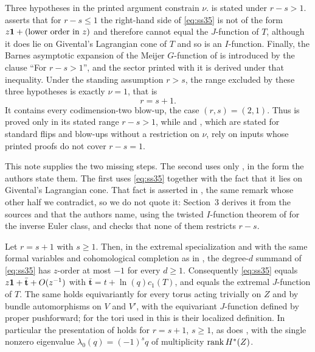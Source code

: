 Three hypotheses in the printed argument constrain \(\nu\).
\cite[Theorem~4.4]{SS} is stated under \(r-s>1\).
\cite[Remark~4.5(3)]{SS} asserts that for \(r-s\le1\) the right-hand side of
\eqref{eq:ss35} is not of the form \(z\mathbf 1+(\text{lower order in }z)\) and
therefore cannot equal the \(J\)-function of \(T\), although it does lie on
Givental's Lagrangian cone of \(T\) and so is an \(I\)-function.  Finally,
the Barnes asymptotic expansion of the Meijer \(G\)-function of
\cite[Lemma~7.4]{SS} is introduced by the clause ``For \(r-s>1\)'', and the
sector \cite[(64)]{SS} printed with it is derived under that inequality.
Under the standing assumption \(r>s\), the range excluded by these three
hypotheses is exactly \(\nu=1\), that is
\[
  r=s+1 .
\]
It contains every codimension-two blow-up, the case \((r,s)=(2,1)\).  Thus
\cite[Theorem~1.2]{SS} is proved only in its stated range \(r-s>1\), while
\cite[Theorems~1.4, 9.9 and~9.14]{SS} and \cite[Corollary~1.5]{SS}, which are
stated for standard flips and blow-ups without a restriction on \(\nu\), rely
on inputs whose printed proofs do not cover \(r-s=1\).

This note supplies the two missing steps.  The second uses only
\cite[Theorems~A.1 and~A.2]{SS}, in the form the authors state them.  The first uses
\eqref{eq:ss35} together with the fact that it lies on Givental's Lagrangian
cone.  That fact is asserted in \cite[Remark~4.5(3)]{SS}, the same remark
whose other half we contradict, so we do not quote it: Section~3 derives it
from the sources \cite{Brown} and \cite{CoatesGivental} that the authors
name, using the twisted \(I\)-function theorem of \cite{CCIT} for the
inverse Euler class, and checks that none of them restricts \(r-s\).

\begin{theorem}
  \label{thm:normalization}
  Let \(r=s+1\) with \(s\ge1\).  Then, in the extremal specialization
  \cite[(33)]{SS} and with the same formal variables and cohomological
  completion as in \cite[Theorem~4.4]{SS}, the degree-\(d\) summand of
  \eqref{eq:ss35} has \(z\)-order at most \(-1\) for every \(d\ge1\).
  Consequently \eqref{eq:ss35} equals \(z\mathbf 1+\bar{\mathbf t}+O(z^{-1})\)
  with \(\bar{\mathbf t}=t+\ln(q)c_{1}(T)\), and equals the extremal
  \(J\)-function of \(T\).  The same holds equivariantly for every torus
  acting trivially on \(Z\) and by bundle automorphisms on \(V\) and \(V'\),
  with the equivariant \(J\)-function defined by proper pushforward; for
  the tori used in \cite{SS} this is their localized definition.
  In particular the presentation \cite[(37)]{SS}
  of \cite[Theorem~4.6]{SS} holds for \(r=s+1\),
  \(s\ge1\), as does \cite[Theorem~1.2]{SS}, with the single nonzero
  eigenvalue \(\lambda_{0}(q)=(-1)^{s}q\) of multiplicity
  \(\operatorname{rank} H^{*}(Z)\).
\end{theorem}

